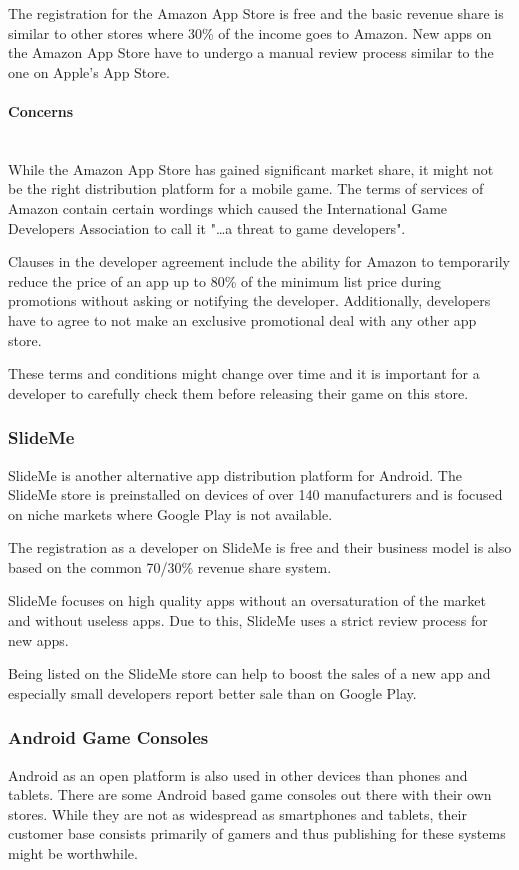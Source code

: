 The registration for the Amazon App Store is free and the basic revenue share is similar to other stores where 30\% of the income goes to Amazon. New apps on the Amazon App Store have to undergo a manual review process similar to the one on Apple's App Store.

\paragraph{Concerns}\mbox{}\\
While the Amazon App Store has gained significant market share, it might not be the right distribution platform for a mobile game. The terms of services of Amazon contain certain wordings which caused the International Game Developers Association to call it "…a threat to game developers". \citep{igda_amazons_2011}

Clauses in the developer agreement include the ability for Amazon to temporarily reduce the price of an app up to 80\% of the minimum list price during promotions without asking or notifying the developer. Additionally, developers have to agree to not make an exclusive promotional deal with any other app store. \citep{igda_amazons_2011}

These terms and conditions might change over time and it is important for a developer to carefully check them before releasing their game on this store.

\subsubsection{SlideMe}
\label{subsec:slideme}
SlideMe is another alternative app distribution platform for Android. The SlideMe store is preinstalled on devices of over 140 manufacturers and is focused on niche markets where Google Play is not available. \citep{about_2016} 

The registration as a developer on SlideMe is free and their business model is also based on the common 70/30\% revenue share system.  

SlideMe focuses on high quality apps without an oversaturation of the market and without useless apps. Due to this, SlideMe uses a strict review process for new apps. 

Being listed on the SlideMe store can help to boost the sales of a new app and especially small developers report better sale than on Google Play. \citep{hill_indie_2015}

\subsubsection{Android Game Consoles}
\label{subsec:android_game_consoles}
Android as an open platform is also used in other devices than phones and tablets. There are some Android based game consoles out there with their own stores. While they are not as widespread as smartphones and tablets, their customer base consists primarily of gamers and thus publishing for these systems might be worthwhile. 

